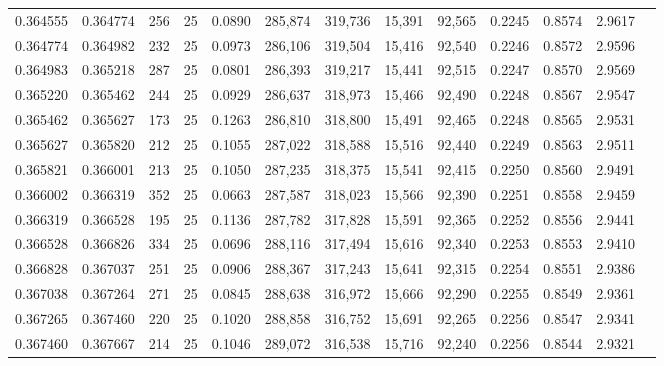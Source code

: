\begin{tabular}{rrrrrrrrrrrrr}
0.364555 & 0.364774 &   256 &  25 &                                     0.0890 & 285,874 & 319,736 &  15,391 &  92,565 & 0.2245 & 0.8574 & 2.9617 \\
0.364774 & 0.364982 &   232 &  25 &                                     0.0973 & 286,106 & 319,504 &  15,416 &  92,540 & 0.2246 & 0.8572 & 2.9596 \\
0.364983 & 0.365218 &   287 &  25 &                                     0.0801 & 286,393 & 319,217 &  15,441 &  92,515 & 0.2247 & 0.8570 & 2.9569 \\
0.365220 & 0.365462 &   244 &  25 &                                     0.0929 & 286,637 & 318,973 &  15,466 &  92,490 & 0.2248 & 0.8567 & 2.9547 \\
0.365462 & 0.365627 &   173 &  25 &                                     0.1263 & 286,810 & 318,800 &  15,491 &  92,465 & 0.2248 & 0.8565 & 2.9531 \\
0.365627 & 0.365820 &   212 &  25 &                                     0.1055 & 287,022 & 318,588 &  15,516 &  92,440 & 0.2249 & 0.8563 & 2.9511 \\
0.365821 & 0.366001 &   213 &  25 &                                     0.1050 & 287,235 & 318,375 &  15,541 &  92,415 & 0.2250 & 0.8560 & 2.9491 \\
0.366002 & 0.366319 &   352 &  25 &                                     0.0663 & 287,587 & 318,023 &  15,566 &  92,390 & 0.2251 & 0.8558 & 2.9459 \\
0.366319 & 0.366528 &   195 &  25 &                                     0.1136 & 287,782 & 317,828 &  15,591 &  92,365 & 0.2252 & 0.8556 & 2.9441 \\
0.366528 & 0.366826 &   334 &  25 &                                     0.0696 & 288,116 & 317,494 &  15,616 &  92,340 & 0.2253 & 0.8553 & 2.9410 \\
0.366828 & 0.367037 &   251 &  25 &                                     0.0906 & 288,367 & 317,243 &  15,641 &  92,315 & 0.2254 & 0.8551 & 2.9386 \\
0.367038 & 0.367264 &   271 &  25 &                                     0.0845 & 288,638 & 316,972 &  15,666 &  92,290 & 0.2255 & 0.8549 & 2.9361 \\
0.367265 & 0.367460 &   220 &  25 &                                     0.1020 & 288,858 & 316,752 &  15,691 &  92,265 & 0.2256 & 0.8547 & 2.9341 \\
0.367460 & 0.367667 &   214 &  25 &                                     0.1046 & 289,072 & 316,538 &  15,716 &  92,240 & 0.2256 & 0.8544 & 2.9321 \\

\end{tabular}
